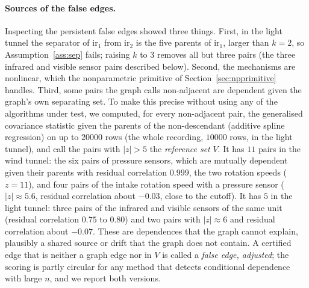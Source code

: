 \paragraph{Sources of the false edges.}
Inspecting the persistent false edges showed three things. First, in the light
tunnel the separator of $\mathrm{ir}_1$ from $\mathrm{ir}_2$ is the five parents of $\mathrm{ir}_1$,
larger than $k=2$, so Assumption~\ref{ass:sep} fails; raising $k$ to $3$ removes
all but three pairs (the three infrared and visible sensor pairs described below). Second, the mechanisms are nonlinear, which the nonparametric
primitive of Section~\ref{sec:npprimitive} handles. Third, some pairs the graph
calls non-adjacent are dependent given the graph's own separating set. To make this
precise without using any of the algorithms under test, we computed, for every
non-adjacent pair, the generalised covariance statistic given the parents of the
non-descendant (additive spline regression) on up to $20000$ rows (the whole
recording, $10000$ rows, in the light tunnel), and call the pairs with $|z|>5$ the
\emph{reference set} $V$. It has $11$ pairs in the wind tunnel: the six pairs of
pressure sensors, which are mutually dependent given their parents with residual
correlation $0.999$, the two rotation speeds ($z=11$), and four pairs of the intake
rotation speed with a pressure sensor ($|z|\approx5.6$, residual correlation about
$-0.03$, close to the cutoff). It has $5$ in the light tunnel: three pairs of the
infrared and visible sensors of the same unit (residual correlation $0.75$ to $0.80$)
and two pairs with $|z|\approx6$ and residual correlation about $-0.07$. These are dependences that the graph cannot explain, plausibly a
shared source or drift that the graph does not contain. A certified edge that is
neither a graph edge nor in $V$ is called a \emph{false edge, adjusted}; the
scoring is partly circular for any method that detects conditional dependence
with large $n$, and we report both versions.

